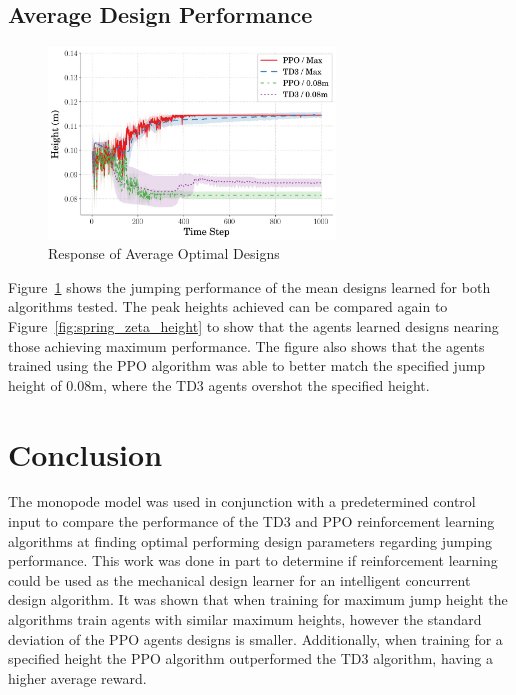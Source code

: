 \documentclass[10pt,twocolumn,letterpaper]{article}
\begin{document}
\subsection{Average Design Performance}
%
\begin{figure}[tb]
        \begin{center}
        \includegraphics[width = 3in]{figures/ppo_vs_td3/avg_height_comp.png}  
        \caption{Response of Average Optimal Designs}
        \label{fig:height_vs_time}
        \end{center}
        \end{figure}

Figure~\ref{fig:height_vs_time} shows the jumping performance of the mean designs learned for both algorithms tested. The peak heights achieved can be compared again to Figure~\ref{fig:spring_zeta_height} to show that the agents learned designs nearing those achieving maximum performance. The figure also shows that the agents trained using the PPO algorithm was able to better
match the specified jump height of 0.08m, where the TD3 agents overshot the specified height.


\section{Conclusion}
\label{sec:conclusion}
The monopode model was used in conjunction with a predetermined control input to compare the performance of the TD3 and PPO reinforcement learning algorithms at finding optimal performing design parameters regarding jumping performance. This work was done in part to determine if reinforcement learning could be used as the mechanical design learner for an intelligent concurrent design algorithm. It was shown that when training for maximum jump height the algorithms train agents with similar maximum heights, however the standard deviation of the PPO agents designs is smaller. 
Additionally, when training for a specified height the PPO algorithm outperformed the TD3 algorithm, having a higher average reward.
\end{document}
